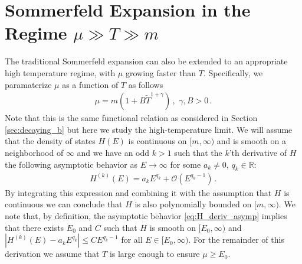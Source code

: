 \documentclass[sn-mathphys,Numbered]{sn-jnl}
\begin{document}


\appendix





\section{Sommerfeld Expansion in the Regime $\mu\gg T\gg m$}\label{Section:HighTempSommerfeld}
The traditional Sommerfeld expansion can also be extended to an appropriate high temperature regime, with $\mu$ growing faster than $T$.  Specifically, we paramaterize $\mu$ as a function of $T$ as follows
\begin{align}\label{eq:mu_infinity_faster}
\mu=m(1+B\widetilde{T}^{1+\gamma}) \,,\,\,\gamma,B>0\,.   
\end{align}
Note that this is the same functional relation as considered in Section \ref{sec:decaying_b} but here we study the high-temperature limit.  We will assume that the density of states $H(E)$ is continuous on $[m,\infty)$ and is smooth on a neighborhood of $\infty$ and we have an odd $k>1$ such that the $k$'th derivative of $H$ the following asymptotic behavior as $E\to\infty$ for some $a_k\neq 0$, $q_k\in\mathbb{R}$:
\begin{align}\label{eq:H_deriv_asymp}
    H^{(k)}(E)=a_kE^{q_k}+ \mathcal{O}(E^{q_k-1})\,.
\end{align}
By integrating this expression and combining it with the assumption that $H$ is continuous we can conclude that $H$ is also polynomially bounded on $[m,\infty)$. We note that, by definition, the asymptotic behavior \eqref{eq:H_deriv_asymp} implies that there exists $E_0$ and $C$ such that $H$ is smooth on $[E_0,\infty)$ and $|H^{(k)}(E)-a_kE^{q_k}|\leq CE^{q_k-1}$ for all $E\in[E_0,\infty)$. For the remainder of this derivation we assume that $T$ is large enough to ensure $\mu\geq E_0$. 
\end{document}
